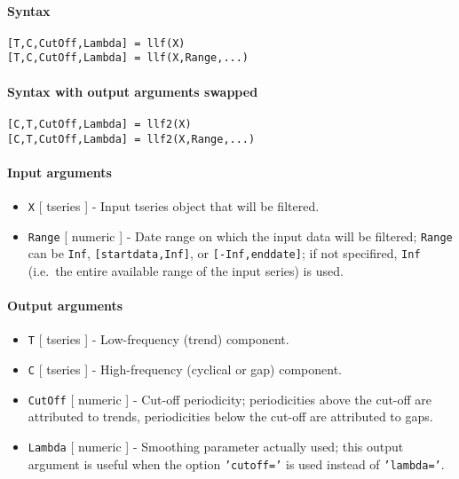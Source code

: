 


	\paragraph{Syntax}\label{syntax}

\begin{verbatim}
[T,C,CutOff,Lambda] = llf(X)
[T,C,CutOff,Lambda] = llf(X,Range,...)
\end{verbatim}

\paragraph{Syntax with output arguments
swapped}\label{syntax-with-output-arguments-swapped}

\begin{verbatim}
[C,T,CutOff,Lambda] = llf2(X)
[C,T,CutOff,Lambda] = llf2(X,Range,...)
\end{verbatim}

\paragraph{Input arguments}\label{input-arguments}

\begin{itemize}
\item
  \texttt{X} {[} tseries {]} - Input tseries object that will be
  filtered.
\item
  \texttt{Range} {[} numeric {]} - Date range on which the input data
  will be filtered; \texttt{Range} can be \texttt{Inf},
  \texttt{{[}startdata,Inf{]}}, or \texttt{{[}-Inf,enddate{]}}; if not
  specifired, \texttt{Inf} (i.e.~the entire available range of the input
  series) is used.
\end{itemize}

\paragraph{Output arguments}\label{output-arguments}

\begin{itemize}
\item
  \texttt{T} {[} tseries {]} - Low-frequency (trend) component.
\item
  \texttt{C} {[} tseries {]} - High-frequency (cyclical or gap)
  component.
\item
  \texttt{CutOff} {[} numeric {]} - Cut-off periodicity; periodicities
  above the cut-off are attributed to trends, periodicities below the
  cut-off are attributed to gaps.
\item
  \texttt{Lambda} {[} numeric {]} - Smoothing parameter actually used;
  this output argument is useful when the option \texttt{'cutoff='} is
  used instead of \texttt{'lambda='}.
\end{itemize}

